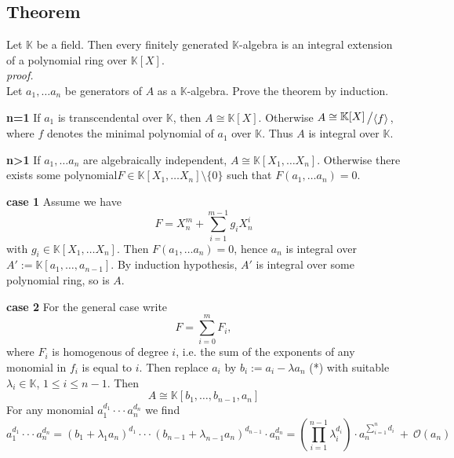 \documentclass[12pt]{book}
\newcommand{\slant}[2]{{\raisebox{.1em}{$#1$}\left/\raisebox{-.1em}{$#2$}\right.}}
\begin{document}
\begin{spacing}{1.3}
\subsection{Theorem} %
\titleformat{\subsection}{\normalfont\normalsize\bfseries}{}{0em}{#1 \thesubsection}
Let $\mathbb{K}$ be a field. Then every finitely generated $\mathbb{K}$-algebra is an integral extension of a polynomial ring over $\mathbb{K}[X]$.\\
\textit{proof.}\\
Let $a_1, \ldots a_n$ be generators of $A$ as a $\mathbb{K}$-algebra. Prove the theorem by induction.
\begin{compactenum}
\item[\textbf{n=1}] If $a_1$ is transcendental over $\mathbb{K}$, then $A \cong \mathbb{K}[X]$. Otherwise $A \cong \slant{\mathbb{K}[X]}{\langle f \rangle}$, where $f$ denotes the minimal polynomial of $a_1$ over $\mathbb{K}$. Thus $A$ is integral over $\mathbb{K}$.
\item[\textbf{n>1}] If $a_1, \ldots a_n$ are algebraically independent, $A \cong \mathbb{K}[X_1, \ldots X_n]$. Otherwise there exists some polynomial\newline $F \in \mathbb{K}[X_1, \ldots X_n] \setminus \{0\}$ such that $F(a_1, \ldots a_n)=0$. 
\begin{compactenum}
\item[\textbf{case 1}] Assume we have
$$F= X_n^m+ \sum_{i=1}^{m-1} g_i X_n^i$$
with $g_i \in \mathbb{K}[X_1, \ldots X_n]$. Then $F(a_1, \ldots a_n)=0$, hence $a_n$ is integral over $A':=\mathbb{K}[a_1, \ldots, a_{n-1}]$. By induction hypothesis, $A'$ is integral over some polynomial ring, so is $A$.
\item[\textbf{case 2}] For the general case write
$$F=\sum_{i=0}^m  F_i,$$
where $F_i$ is homogenous of degree $i$, i.e. the sum of the exponents of any monomial in $f_i$ is equal to $i$. Then replace $a_i$ by $b_i:=a_i- \lambda a_n$ (*) with suitable $\lambda_i \in \mathbb{K}$, $1 \leqslant i \leqslant n-1$. Then 
$$A \cong \mathbb{K}[b_1, \ldots, b_{n-1}, a_n]$$
For any monomial $a_1^{d_1} \cdot \cdot \cdot a_n^{d_n}$ we find 
$$a_1^{d_1} \cdot \cdot \cdot a_n^{d_n} = \left(b_1+\lambda_1 a_n\right)^{d_1} \cdot \cdot \cdot \left(b_{n-1}+\lambda_{n-1}a_n\right)^{d_{n-1}} \cdot a_n^{d_n} = \left(\prod_{i=1}^{n-1} \lambda_i^{d_i}\right) \cdot a_n^{\sum_{i=1}^n d_i} \ + \ \mathcal{O}(a_n)$$

\end{compactenum}
\end{compactenum}
\end{spacing}
\end{document}
